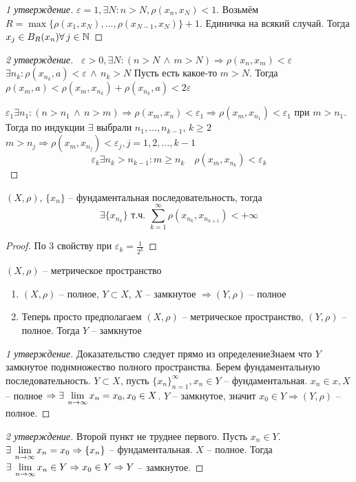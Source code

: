 \documentclass[document]{subfiles}
\begin{document}
\begin{proof}[1 утверждение]
        $\varepsilon = 1, \exists N: n > N, \rho (x_n, x_N) < 1$. Возьмём $R = \max \{\rho(x_1, x_N), \ldots, \rho(x_{N-1},x_{N}) \} + 1$. Единичка на всякий случай.
        Тогда $x_j \in B_R(x_n) \forall j \in \bN$
\end{proof}
\begin{proof}[2 утверждение]
        \ $\varepsilon > 0, \exists N : (n > N \, \wedge \, m > N) \Rightarrow \rho(x_n, x_m) < \varepsilon$
            $\exists n_k: \rho(x_{n_k}, a) < \varepsilon \, \wedge \,
            n_k > N$
        Пусть есть какое-то $m > N$. Тогда $\rho(x_m, a) < \rho(x_m, x_{n_k}) + \rho(x_{n_k}, a) < 2 \varepsilon$
        \item $\varepsilon_1 \exists n_1: (n > n_1 \, \wedge \, n > m) \Rightarrow \rho(x_m,x_n) < \varepsilon_1 \Rightarrow \rho(x_m, x_{n_1}) < \varepsilon_1$ при $m > n_1$.
        Тогда по индукции $\exists$ выбрали $n_1, \ldots, n_{k-1}$, $k \geq 2$
        $m > n_j \Rightarrow \rho (x_m, x_{n_j}) < \varepsilon_j, j = 1,2, \ldots, k-1$
        \[ \varepsilon_k \exists n_k > n_{k-1}: m \geq n_k \quad \rho (x_m, x_{n_k}) < \varepsilon_k \]
\end{proof}

\begin{corollary}
    $(X, \rho)$, $\{x_n\}$ -- фундаментальная последовательность, тогда 
    \[ \exists \{x_{n_k} \} \text { т.ч. } \sum_{k=1}^\infty \rho(x_{n_k}, x_{n_{k+1}}) < + \infty \]
\end{corollary}
\begin{proof}
    По 3 свойству при $\varepsilon_k = \frac{1}{2^k}$
\end{proof}

\begin{theorem}
    $(X,\rho)$ -- метрическое пространство
    \begin{enumerate}
        \item $(X, \rho)$ -- полное, $Y \subset X$, $X$ -- замкнутое $\Rightarrow (Y, \rho)$ -- полное
        \item Теперь просто предполагаем $(X,\rho)$ -- метрическое пространство, $(Y,\rho)$ -- полное. Тогда $Y$ -- замкнутое
    \end{enumerate}
\end{theorem}

\begin{proof}[1 утверждение]
        Доказательство следует прямо из определениеЗнаем что $Y$ замкнутое поднмножество полного пространства.
        Берем фундаментальную последовательность. $Y \subset X$, пусть $\{x_n\}^\infty_{n=1}, x_n \in Y$ -- фундаментальная.
        $x_n \in x, X$ -- полное $\Rightarrow \exists  \liml_{n \to \infty} x_n = x_0, x_0 \in X$. $Y$ -- замкнутое, значит $x_0 \in Y \Rightarrow (Y, \rho)$ -- полное.
\end{proof}
\begin{proof}[2 утверждение]
        Второй пункт не труднее первого. Пусть $x_n \in Y$. $\exists \liml_{n \to \infty} x_n = x_0 \Rightarrow \{x_n\}$ -- фундаментальная.
        $X$ -- полное. Тогда $\exists \liml_{n \to \infty} x_n \in Y \Rightarrow x_0 \in Y \Rightarrow Y$ -- замкнутое.
\end{proof}
\end{document}
